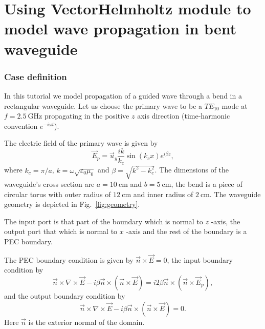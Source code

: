 \chapter{Using VectorHelmholtz module to model wave propagation in bent waveguide}
\label{vectorhelmholtz-bent-waveguide-chapt}



\subsection*{Case definition}

In this tutorial we model propagation of a guided wave through a bend in a rectangular
waveguide.  Let us choose the primary wave to be a $TE_{10}$ mode at $f=2.5~
\mathrm{GHz}$ propagating in the positive $z$ axis direction (time-harmonic
convention $e^{-i\omega t}$).

The electric field of the primary wave is given by
\[ \vec E_p = \vec u_y \frac{ik}{k_c}\sin(k_cx)e^{i\beta z},\]
where $k_c = \pi / a$, $k = \omega \sqrt{\varepsilon_0 \mu_0}$ and $\beta =
\sqrt{k^2-k_c^2}$. The dimensions of the waveguide's cross section are 
$a=10~ \mathrm{cm}$ and $b=5~ \mathrm{cm}$, the bend is a piece of circular
torus with outer radius of $12~ \mathrm{cm}$ and inner radius of $2~
\mathrm{cm}$. The waveguide geometry is depicted in Fig.~\ref{fig:geometry}.

The input port is that part of the boundary which is normal to $z$ -axis, 
the output port that which is normal to $x$ -axis and the rest of the boundary is
a PEC boundary.

The PEC boundary condition is given by $\vec n \times \vec E = 0$, the
input boundary condition by
\[\vec n \times \nabla \times \vec E - i\beta \vec n \times 
        (\vec n \times \vec E) = i2\beta \vec n \times 
                                     (\vec n \times \vec E_p),\]
and the output boundary condition by
\[\vec n \times \nabla \times \vec E - i\beta \vec n \times (\vec n \times \vec E)=0.\]
Here $\vec n$ is the exterior normal of the domain.


